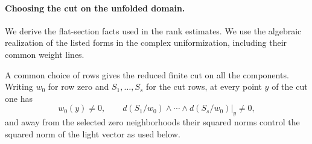 \paragraph{Choosing the cut on the unfolded domain.}
\label{par:slice-interpolation}
\hypertarget{source-slice-interpolation}{}
We derive the flat-section facts used in the rank estimates.
We use the algebraic realization of the listed forms in the
complex uniformization, including their common weight lines.
\begin{lemma}
\label{lem:transverse-selected-cut}
A common choice of rows gives the reduced finite cut on all the
components. Writing \(w_0\) for row zero and \(S_1,\ldots,S_s\) for the cut rows, at every point \(y\) of the cut one has
\[
 w_0(y)\ne0,\qquad d(S_1/w_0)\wedge\cdots\wedge d(S_s/w_0)|_y\ne0,
\]
 and away from the selected
zero neighborhoods their squared norms control the squared norm of
the light vector as used below.
\end{lemma}

